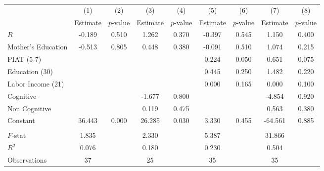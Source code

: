 \begin{tabular}{lcccccccc} \toprule
 & (1) & (2) & (3) & (4) & (5) & (6) & (7) & (8) \\ 
 & Estimate  & $p$-value  & Estimate  & $p$-value  & Estimate  & $p$-value  & Estimate  & $p$-value  \\  \midrule
$R$ &    -0.189 &     0.510 &     1.262 &     0.370 &    -0.397 &     0.545 &     1.150 &     0.400 \\  
Mother's Education &    -0.513 &     0.805 &     0.448 &     0.380 &    -0.091 &     0.510 &     1.074 &     0.215 \\  
PIAT (5-7) &         &         &         &         &     0.224 &     0.050 &     0.651 &     0.075 \\  
Education (30) &         &         &         &         &     0.445 &     0.250 &     1.482 &     0.220 \\  
Labor Income (21) &         &         &         &         &     0.000 &     0.165 &     0.000 &     0.100 \\  
Cognitive &         &         &    -1.677 &     0.800 &         &         &    -4.854 &     0.920 \\  
Non Cognitive &         &         &     0.119 &     0.475 &         &         &     0.563 &     0.380 \\  
Constant &    36.443 &     0.000 &    26.285 &     0.030 &     3.330 &     0.455 &   -64.561 &     0.885 \\  \\ \midrule
$F$-stat &     1.835 &         &     2.330 &         &     5.387 &         &    31.866 &         \\  
$R^2$ &     0.076 &         &     0.180 &         &     0.230 &         &     0.504 &         \\  
Observations &    37 &         &    25 &         &    35 &         &    35 &         \\  
\bottomrule \end{tabular}

